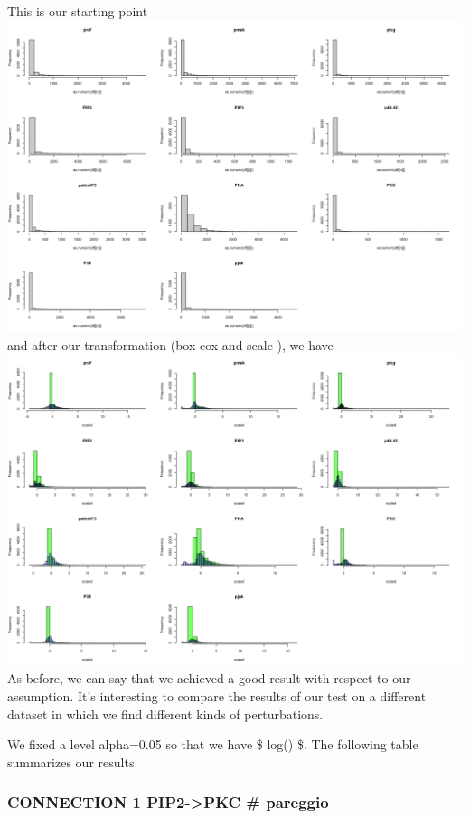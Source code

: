 \documentclass[
]{article}
\begin{document}
This is our starting point
\includegraphics{data/distribution_plots/original/concatenated.png} and
after our transformation (box-cox and scale ), we have
\includegraphics{data/distribution_plots/scaled_vs_normalized/concatenated.png}
As before, we can say that we achieved a good result with respect to our
assumption. It's interesting to compare the results of our test on a
different dataset in which we find different kinds of perturbations.

We fixed a level alpha=0.05 so that we have \$
log() \$. The following table summarizes our
results.

\hypertarget{connection-1-pip2-pkc-pareggio-1}{%
\subsubsection{CONNECTION 1 PIP2-\textgreater PKC \#
pareggio}\label{connection-1-pip2-pkc-pareggio-1}}
\end{document}
